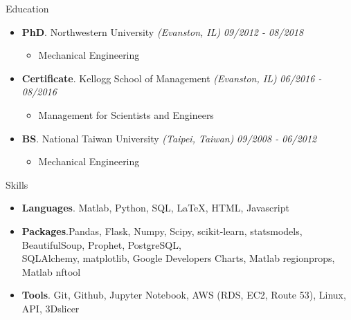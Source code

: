 \documentclass{resume} %
\begin{document}
	
	
	\begin{rSection}{Education}
		\begin{itemize}[leftmargin=0em]
			\item {\bf PhD}{. Northwestern University} \textit{(Evanston, IL)} \hfill {\em 09/2012 - 08/2018} 
			\vspace{-3mm}
			\begin{itemize}
				\setlength\itemsep{-3em}
				\item Mechanical Engineering
			\end{itemize}
			\item {\bf Certificate}{. Kellogg School of Management} \textit{(Evanston, IL)} \hfill {\em 06/2016 - 08/2016} 
			\vspace{-3mm}
			\begin{itemize}
				\setlength\itemsep{-3em}
				\item Management for Scientists and Engineers
			\end{itemize}
			\item {\bf BS}{. National Taiwan University} \textit{(Taipei, Taiwan)} \hfill {\em 09/2008 - 06/2012} 
			\vspace{-3mm}
			\begin{itemize}
				\setlength\itemsep{-3em}
				\item Mechanical Engineering
			\end{itemize}
		\end{itemize}
		
		
		
		
		
	\end{rSection}
	
	\begin{rSection}{Skills}
		\begin{itemize}[leftmargin=0em]
			\item {\bf Languages}{. Matlab, Python, SQL, LaTeX, HTML, Javascript}
			\item {\bf Packages}{.Pandas, Flask, Numpy, Scipy, scikit-learn, statsmodels, BeautifulSoup, Prophet, PostgreSQL, \\SQLAlchemy, matplotlib, Google Developers Charts, Matlab regionprops, Matlab nftool}
			\item {\bf Tools}{. Git, Github, Jupyter Notebook, AWS (RDS, EC2, Route 53), Linux, API, 3Dslicer}
			
		\end{itemize}
	\end{rSection}
	
	
	
	
\end{document}
